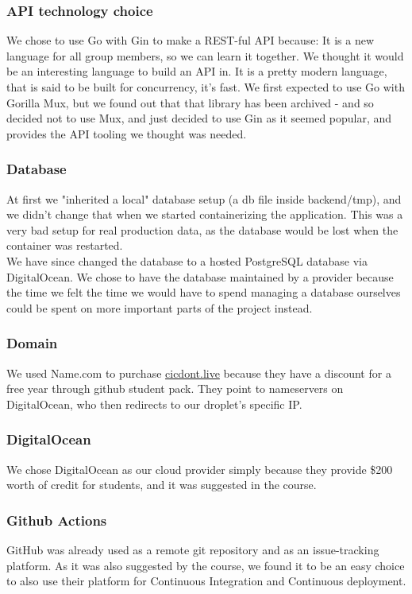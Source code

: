 \subsubsection{API technology choice}
We chose to use Go with Gin to make a REST-ful API because:
It is a new language for all group members, so we can learn it together. We thought it would be an interesting language to build an API in. It is a pretty modern language, that is said to be built for concurrency, it's fast. We first expected to use Go with Gorilla Mux, but we found out that that library has been archived - and so decided not to use Mux, and just decided to use Gin as it seemed popular, and provides the API tooling we thought was needed.
\subsubsection{Database}
At first we "inherited a local" database setup (a db file inside backend/tmp), and we didn't change that when we started containerizing the application. This was a very bad setup for real production data, as the database would be lost when the container was restarted. \\
We have since changed the database to a hosted PostgreSQL database via DigitalOcean. We chose to have the database maintained by a provider because the time we felt the time we would have to spend managing a database ourselves could be spent on more important parts of the project instead.
\subsubsection{Domain}
We used Name.com to purchase \url{cicdont.live} because they have a discount for a free year through github student pack. They point to nameservers on DigitalOcean, who then redirects to our droplet's specific IP. 

\subsubsection{DigitalOcean}
We chose DigitalOcean as our cloud provider simply because they provide \$200 worth of credit for students, and it was suggested in the course.

\subsubsection{Github Actions}
GitHub was already used as a remote git repository and as an issue-tracking platform. As it was also suggested by the course, we found it to be an easy choice to also use their platform for Continuous Integration and Continuous deployment. 

